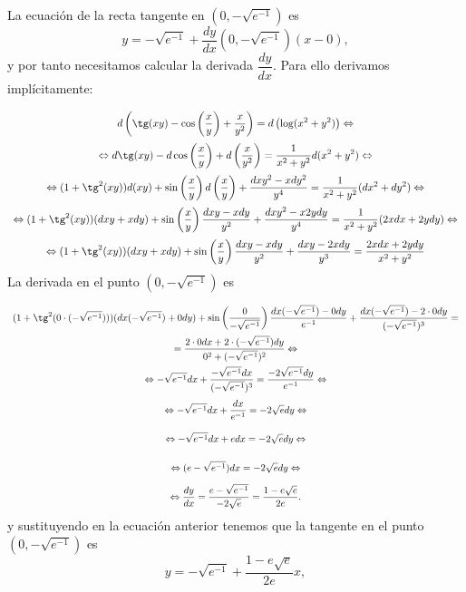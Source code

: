 {La ecuación de la recta tangente en $(0,-\sqrt{e^{-1}})$ es
\begin{equation}
y = -\sqrt{e^{-1}} + \frac{dy}{dx}(0,-\sqrt{e^{-1}})(x-0),
\end{equation}
y por tanto necesitamos calcular la derivada $\dfrac{dy}{dx}$. Para ello derivamos implícitamente:
\[
\renewcommand{\arraystretch}{2.5}
\begin{array}{c}
\displaystyle
d\left(\tg(xy)-\cos\left( \frac{x}{y}\right)+\frac{x}{y^2}\right) = d\left( \log (x^2+y^2)\right) \Leftrightarrow \\ \displaystyle
\Leftrightarrow
d\tg(xy)-d\cos\left(\frac{x}{y}\right)+d\left( \frac{x}{y^2}\right)=
\frac{1}{x^2+y^2}d(x^2+y^2) \Leftrightarrow \\ \displaystyle
\Leftrightarrow
(1+\tg^2(xy))d(xy)+\sin\left( \frac{x}{y}\right)d\left( \frac{x}{y}\right) +\frac{dxy^2-xdy^2}{y^4} =
\frac{1}{x^2+y^2}(dx^2+dy^2) \Leftrightarrow \\ \displaystyle
\Leftrightarrow
(1+\tg^2(xy))(dxy+xdy)+\sin\left( \frac{x}{y}\right) \frac{dxy-xdy}{y^2}+\frac{dxy^2-x2ydy}{y^4} =
\frac{1}{x^2+y^2}(2xdx+2ydy) \Leftrightarrow \\ \displaystyle
\Leftrightarrow
(1+\tg^2(xy))(dxy+xdy)+\sin\left(\frac{x}{y}\right)\frac{dxy-xdy}{y^2}+\frac{dxy-2xdy}{y^3} =
\frac{2xdx+2ydy}{x^2+y^2}
\end{array}
\]
La derivada en el punto $(0,-\sqrt{e^{-1}})$ es
\[
\renewcommand{\arraystretch}{2.5}
\begin{array}{c}\displaystyle
(1+\tg^2(0\cdot
(-\sqrt{e^{-1}})))(dx(-\sqrt{e^{-1}})+0dy)+\sin\left(\frac{0}{-\sqrt{e^{-1}}}\right)\frac{dx(-\sqrt{e^{-1}})-0dy}{e^{-1}}+\frac{dx(-\sqrt{e^{-1}})-2\cdot 0dy}{(-\sqrt{e^{-1}})^3} =\\
\displaystyle
= \frac{2\cdot 0dx+2\cdot (-\sqrt{e^{-1}})dy}{0^2+(-\sqrt{e^{-1}})^2}
\Leftrightarrow\\ \displaystyle
\Leftrightarrow -\sqrt{e^{-1}}dx+\frac{-\sqrt{e^{-1}}dx}{(-\sqrt{e^{-1}})^3} = \frac{-2\sqrt{e^{-1}}dy}{e^{-1}} \Leftrightarrow\\ \displaystyle
\Leftrightarrow -\sqrt{e^{-1}}dx+\frac{dx}{e^{-1}} =
-2\sqrt{e}dy \Leftrightarrow\\ \displaystyle
\Leftrightarrow -\sqrt{e^{-1}}dx+edx = -2\sqrt{e}dy \Leftrightarrow\\
\displaystyle \Leftrightarrow (e-\sqrt{e^{-1}})dx = -2\sqrt{e}dy
\Leftrightarrow\\
\displaystyle \Leftrightarrow \frac{dy}{dx} =
\frac{e-\sqrt{e^{-1}}}{-2\sqrt{e}} = \frac{1-e\sqrt{e}}{2e}.
\end{array}
\]
y sustituyendo en la ecuación anterior tenemos que la tangente en el punto  $(0,-\sqrt{e^{-1}})$ es
\[
y = -\sqrt{e^{-1}} + \frac{1-e\sqrt{e}}{2e} x,
\]

}
